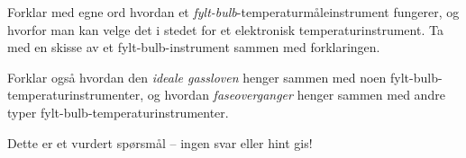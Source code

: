 

Forklar med egne ord hvordan et {\it fylt-bulb}-temperaturmåleinstrument fungerer, og hvorfor man kan velge det i stedet for et elektronisk temperaturinstrument.  Ta med en skisse av et fylt-bulb-instrument sammen med forklaringen.

\vskip 10pt

Forklar også hvordan den {\it ideale gassloven} henger sammen med noen fylt-bulb-temperaturinstrumenter, og hvordan {\it faseoverganger} henger sammen med andre typer fylt-bulb-temperaturinstrumenter.

\vfil

\eject






Dette er et vurdert spørsmål -- ingen svar eller hint gis!









